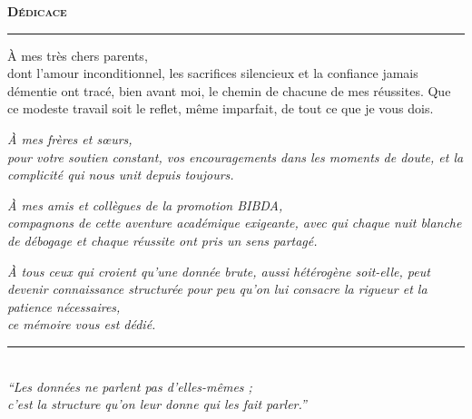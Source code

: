 \vspace*{2.2cm}
\begin{center}
    {\Large \scshape \color{titleblue} \textbf{Dédicace}} \\[0.15cm]
    \textcolor{bordergreen}{\rule{4.5cm}{0.8pt}}
\end{center}

\vspace{1.8cm}

\begin{center}
\begin{minipage}{0.82\textwidth}
\setlength{\parindent}{0pt}
\raggedright
\Large
\itshape

À mes très chers parents, \\[0.3cm]
\normalsize\upshape
dont l'amour inconditionnel, les sacrifices silencieux et la confiance
jamais démentie ont tracé, bien avant moi, le chemin de chacune de mes
réussites. Que ce modeste travail soit le reflet, même imparfait, de
tout ce que je vous dois.

\vspace{0.9cm}
\Large\itshape
À mes frères et sœurs, \\[0.3cm]
\normalsize\upshape
pour votre soutien constant, vos encouragements dans les moments de
doute, et la complicité qui nous unit depuis toujours.

\vspace{0.9cm}
\Large\itshape
À mes amis et collègues de la promotion BIBDA, \\[0.3cm]
\normalsize\upshape
compagnons de cette aventure académique exigeante, avec qui chaque
nuit blanche de débogage et chaque réussite ont pris un sens partagé.

\vspace{0.9cm}
\Large\itshape
À tous ceux qui croient qu'une donnée brute, aussi hétérogène
soit-elle, peut devenir connaissance structurée pour peu qu'on lui
consacre la rigueur et la patience nécessaires, \\[0.3cm]
\normalsize\upshape
ce mémoire vous est dédié.

\end{minipage}
\end{center}

\vfill
\begin{center}
    \textcolor{lineblue}{\rule{6cm}{0.6pt}}\\[0.25cm]
    {\small \itshape ``Les données ne parlent pas d'elles-mêmes ;\\
    c'est la structure qu'on leur donne qui les fait parler.''}
\end{center}
\vspace{1.5cm}

\newpage